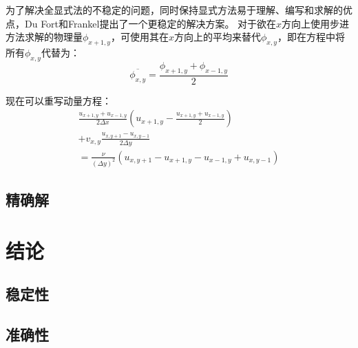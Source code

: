\documentclass[12pt]{ctexart}
\begin{document}
为了解决全显式法的不稳定的问题，同时保持显式方法易于理解、编写和求解的优点，Du Fort和Frankel提出了一个更稳定的解决方案\cite{du1953stability}。
对于欲在$x$方向上使用步进方法求解的物理量$\phi_{x+1,y}$，可使用其在$x$方向上的平均来替代$\phi_{x, y}$，即在方程中将所有$\phi_{x,y}$代替为：
\[ \overline{\phi_{x,y}} = \frac{\phi_{x+1,y} + \phi_{x-1,y}}{2} \]

现在可以重写动量方程：
\begin{multline*}
    \frac{u_{x+1,y} + u_{x-1,y}}{2 \Delta x} \left( u_{x+1,y} - \frac{u_{x+1,y}+u_{x-1,y}}{2} \right) \\
    + v_{x,y} \frac{u_{x, y+1} - u_{x, y-1}}{2 \Delta y} \\
    = \frac{\nu}{(\Delta y)^2} (u_{x,y+1} - u_{x+1,y} - u_{x-1,y} + u_{x,y-1})
\end{multline*}
    

\subsection{精确解}

\section{结论}

\subsection{稳定性}

\subsection{准确性}

\printbibliography
\end{document}
